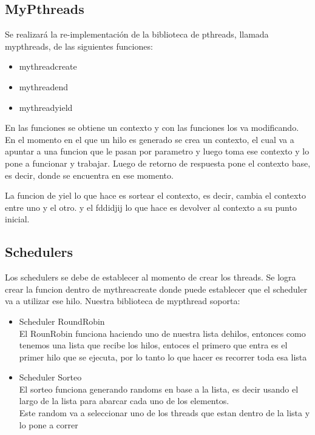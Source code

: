 \documentclass{article}
\begin{document}
\subsection{MyPthreads}
Se realizará la re-implementación de la biblioteca de pthreads, llamada mypthreads, de las siguientes funciones:
\begin{itemize}
\item mythreadcreate
\item mythreadend
\item mythreadyield
\end{itemize}

En las funciones se obtiene un contexto y con las funciones los va modificando.
En el momento en el que un hilo es generado se crea un contexto, el cual va a apuntar a una funcion que le pasan por parametro y luego toma ese contexto y lo pone a funcionar y trabajar. 
Luego de retorno de respuesta pone el contexto base, es decir, donde se encuentra en ese momento.

La funcion de yiel lo que hace es sortear el contexto, es decir, cambia el contexto entre uno y el otro. y el fddidjij lo que hace es devolver al contexto a su punto inicial.

\subsection{Schedulers}
Los schedulers se debe de establecer al momento de crear los threads.
Se logra crear la funcion dentro de mythreacreate donde puede establecer que el scheduler va a utilizar ese hilo.
Nuestra biblioteca de mypthread soporta:
\begin{itemize}
\item Scheduler RoundRobin\\
El RounRobin funciona haciendo uno de nuestra lista dehilos, entonces como tenemos una lista que recibe los hilos, entoces el primero que entra es el primer hilo que se ejecuta, por lo tanto lo que hacer es recorrer toda esa lista
\item Scheduler Sorteo\\
El sorteo funciona generando randoms en base a la lista, es decir usando el largo de la lista para abarcar cada uno de los elementos.\\ Este random va a seleccionar uno de los threads que estan dentro de la lista y lo pone a correr
\end{itemize}



\newpage
\end{document}
